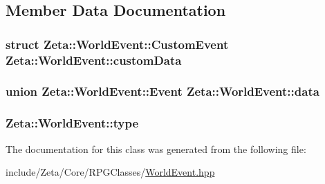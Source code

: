 \subsection{Member Data Documentation}
\hypertarget{classZeta_1_1WorldEvent_af5a8141d88420a5b1422db410719726b}{
\subsubsection[{custom\+Data}]{\setlength{\rightskip}{0pt plus 5cm}struct {\bf Zeta\+::\+World\+Event\+::\+Custom\+Event}  Zeta\+::\+World\+Event\+::custom\+Data}}\label{classZeta_1_1WorldEvent_af5a8141d88420a5b1422db410719726b}
\hypertarget{classZeta_1_1WorldEvent_ac1d7d4643296098531c46b737eed053d}{
\subsubsection[{data}]{\setlength{\rightskip}{0pt plus 5cm}union {\bf Zeta\+::\+World\+Event\+::\+Event}  Zeta\+::\+World\+Event\+::data}}\label{classZeta_1_1WorldEvent_ac1d7d4643296098531c46b737eed053d}
\hypertarget{classZeta_1_1WorldEvent_a67ce954f9d4c03e0525640125068dfef}{
\subsubsection[{type}]{ Zeta\+::\+World\+Event\+::type}}\label{classZeta_1_1WorldEvent_a67ce954f9d4c03e0525640125068dfef}


The documentation for this class was generated from the following file\+:\begin{DoxyCompactItemize}
\item 
include/\+Zeta/\+Core/\+R\+P\+G\+Classes/\hyperlink{WorldEvent_8hpp}{World\+Event.\+hpp}\end{DoxyCompactItemize}
